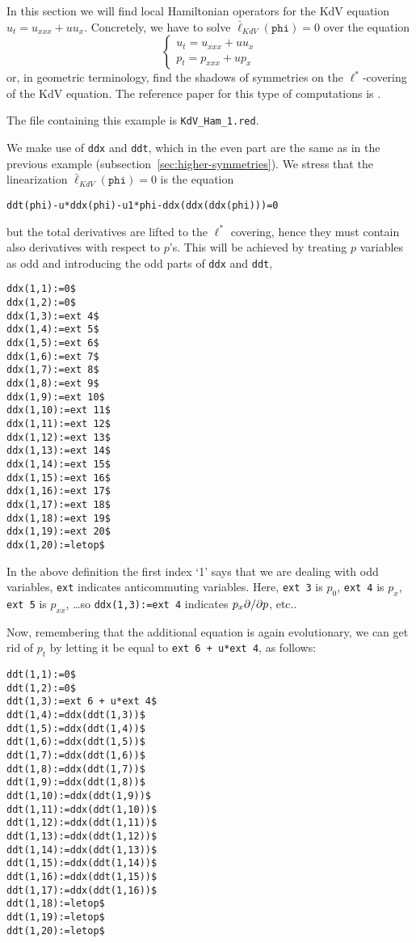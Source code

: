 \documentclass[12pt]{amsart}
\theoremstyle{definition}
\newcommand*{\pd}[2]{\mathchoice{\frac{\partial#1}{\partial#2}}
  {\partial#1/\partial#2}{\partial#1/\partial#2}
  {\partial#1/\partial#2}}
\begin{document}
In this section we will find local Hamiltonian operators for the KdV equation
$u_t=u_{xxx}+uu_x$. Concretely, we have to solve $\bar
\ell_{KdV}(\mathtt{phi})=0$ over the equation
\begin{displaymath}
  \left\{\begin{array}{l}
    u_t=u_{xxx}+uu_x\\
    p_t=p_{xxx}+up_x
  \end{array}\right.
\end{displaymath}
or, in geometric terminology, find the shadows of symmetries on the
$\ell^*$-covering of the KdV equation. The reference paper for this type of
computations is \cite{KKV}.

The file containing this example is \texttt{KdV\_Ham\_1.red}.

We make use of \texttt{ddx} and \texttt{ddt}, which in the even part are the
same as in the previous example (subsection~\ref{sec:higher-symmetries}).  We
stress that the linearization $\bar \ell_{KdV}(\mathtt{phi})=0$ is the equation
\begin{verbatim}
ddt(phi)-u*ddx(phi)-u1*phi-ddx(ddx(ddx(phi)))=0
\end{verbatim}
but the total derivatives are lifted to the $\ell^*$ covering, hence they must
contain also derivatives with respect to $p$'s. This will be achieved by
treating $p$ variables as odd and introducing the odd parts of \texttt{ddx} and
\texttt{ddt},
\begin{verbatim}
ddx(1,1):=0$
ddx(1,2):=0$
ddx(1,3):=ext 4$
ddx(1,4):=ext 5$
ddx(1,5):=ext 6$
ddx(1,6):=ext 7$
ddx(1,7):=ext 8$
ddx(1,8):=ext 9$
ddx(1,9):=ext 10$
ddx(1,10):=ext 11$
ddx(1,11):=ext 12$
ddx(1,12):=ext 13$
ddx(1,13):=ext 14$
ddx(1,14):=ext 15$
ddx(1,15):=ext 16$
ddx(1,16):=ext 17$
ddx(1,17):=ext 18$
ddx(1,18):=ext 19$
ddx(1,19):=ext 20$
ddx(1,20):=letop$
\end{verbatim}
In the above definition the first index `1' says that we are dealing with odd
variables, \texttt{ext} indicates anticommuting variables. Here, \texttt{ext 3}
is $p_0$, \texttt{ext 4} is $p_x$, \texttt{ext 5} is $p_{xx}$, \dots so
\texttt{ddx(1,3):=ext 4} indicates $p_x\pd{}{p}$, etc..

Now, remembering that the additional equation is again evolutionary, we can get
rid of $p_t$ by letting it be equal to \texttt{ext 6 + u*ext 4}, as follows:
\begin{verbatim}
ddt(1,1):=0$
ddt(1,2):=0$
ddt(1,3):=ext 6 + u*ext 4$
ddt(1,4):=ddx(ddt(1,3))$
ddt(1,5):=ddx(ddt(1,4))$
ddt(1,6):=ddx(ddt(1,5))$
ddt(1,7):=ddx(ddt(1,6))$
ddt(1,8):=ddx(ddt(1,7))$
ddt(1,9):=ddx(ddt(1,8))$
ddt(1,10):=ddx(ddt(1,9))$
ddt(1,11):=ddx(ddt(1,10))$
ddt(1,12):=ddx(ddt(1,11))$
ddt(1,13):=ddx(ddt(1,12))$
ddt(1,14):=ddx(ddt(1,13))$
ddt(1,15):=ddx(ddt(1,14))$
ddt(1,16):=ddx(ddt(1,15))$
ddt(1,17):=ddx(ddt(1,16))$
ddt(1,18):=letop$
ddt(1,19):=letop$
ddt(1,20):=letop$
\end{verbatim}
\end{document}
